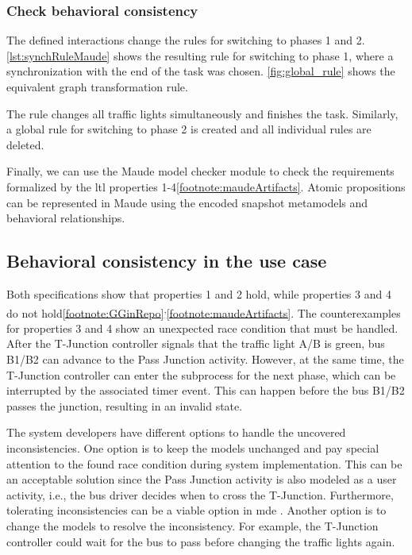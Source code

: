 \documentclass{jot}
\begin{document}
\subsubsection{Check behavioral consistency}
The defined interactions change the rules for switching to phases 1 and 2. \autoref{lst:synchRuleMaude} shows the resulting rule for switching to phase 1, where a synchronization with the end of the task was chosen.
\autoref{fig:global_rule} shows the equivalent graph transformation rule.


The rule changes all traffic lights simultaneously and finishes the task.
Similarly, a global rule for switching to phase 2 is created and all individual rules are deleted.

Finally, we can use the Maude model checker module to check the requirements formalized by the \gls*{ltl} properties 1-4\cref{footnote:maudeArtifacts}.
Atomic propositions can be represented in Maude using the encoded snapshot metamodels and behavioral relationships.


\subsection{Behavioral consistency in the use case}
Both specifications show that properties 1 and 2 hold, while properties 3 and 4 do not hold\cref{footnote:GGinRepo}\textsuperscript{,}\cref{footnote:maudeArtifacts}.
The counterexamples for properties 3 and 4 show an unexpected race condition that must be handled.
After the T-Junction controller signals that the traffic light A/B is green, bus B1/B2 can advance to the \textsf{Pass Junction} activity.
However, at the same time, the T-Junction controller can enter the subprocess for the next phase, which can be interrupted by the associated timer event.
This can happen before the bus B1/B2 passes the junction, resulting in an invalid state.

The system developers have different options to handle the uncovered inconsistencies.
One option is to keep the models unchanged and pay special attention to the found race condition during system implementation.
This can be an acceptable solution since the \textsf{Pass Junction} activity is also modeled as a user activity, i.e., the bus driver decides when to cross the T-Junction.
Furthermore, tolerating inconsistencies can be a viable option in \gls*{mde} \cite{weidmannToleranceModelDrivenEngineering2021}.
Another option is to change the models to resolve the inconsistency.
For example, the T-Junction controller could wait for the bus to pass before changing the traffic lights again.
\end{document}

